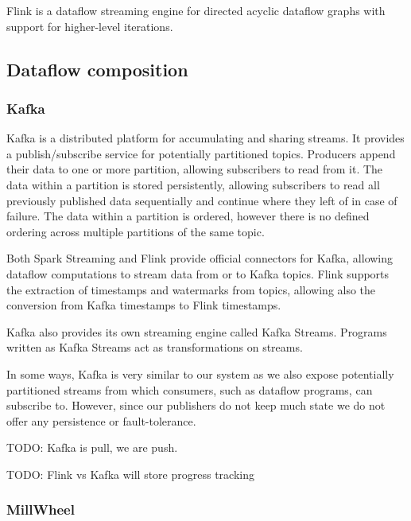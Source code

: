 Flink \cite{flink} is a dataflow streaming engine for directed acyclic dataflow
graphs with support for higher-level iterations. 


\subsection{Dataflow composition}

\subsubsection{Kafka}

Kafka \cite{kafka} is a distributed platform for accumulating and sharing streams. It provides
a publish/subscribe service for potentially partitioned topics. Producers append
their data to one or more partition, allowing subscribers to read from it.
The data within a partition is stored persistently, allowing subscribers to
read all previously published data sequentially and continue where they left
of in case of failure. The data within a partition is ordered, however there
is no defined ordering across multiple partitions of the same topic.

Both Spark Streaming and Flink provide official connectors for Kafka, allowing
dataflow computations to stream data from or to Kafka topics. Flink supports
the extraction of timestamps and watermarks from topics, allowing also the
conversion from Kafka timestamps to Flink timestamps.

Kafka also provides its own streaming engine called Kafka Streams. Programs
written as Kafka Streams act as transformations on streams.

In some ways, Kafka is very similar to our system as we also expose potentially
partitioned streams from which consumers, such as dataflow programs, can subscribe
to. However, since our publishers do not keep much state we do not offer any
persistence or fault-tolerance.

TODO: Kafka is pull, we are push.

TODO: Flink vs Kafka will store progress tracking


\subsubsection{MillWheel}

